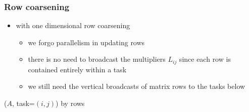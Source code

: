 \begin{frame}[fragile]
%
  \frametitle{Row coarsening}
%
  \begin{itemize}
%
  \item with one dimensional row coarsening
    \begin{itemize}
    \item we forgo parallelism in updating rows
    \item there is no need to broadcast the multipliers $L_{ij}$ since each row is contained
      entirely within a task
    \item we still need the vertical broadcasts of matrix rows to the tasks below
    \end{itemize}
%
  \end{itemize}
%
  \begin{center}
    \begin{minipage}{.85\linewidth}
      \begin{algorithm}[H]
        \label{alg:pLU-ij-rows}
%
        \dontprintsemicolon
        \setalcaphskip{0ex}
%
        \caption{\lu($A$, task=$(i,j)$) by rows}
%
% 
      \end{algorithm}
    \end{minipage}
  \end{center}
% 
\end{frame}

